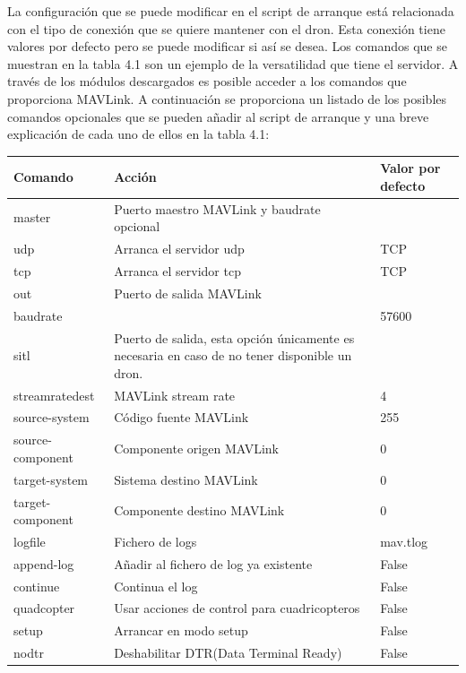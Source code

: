 La configuración que se puede modificar en el script de arranque está relacionada con el tipo de conexión que se quiere mantener con el dron. Esta conexión tiene valores por defecto pero se puede modificar si así se desea. Los comandos que se muestran en la tabla 4.1 son un ejemplo de la versatilidad que tiene el servidor. A través de los módulos descargados es posible acceder a los comandos que proporciona MAVLink. A continuación se proporciona un listado de los posibles comandos opcionales que se pueden añadir al script de arranque y una breve explicación de cada uno de ellos en la tabla 4.1:

\begin{center}
  \label{tab:scriptArranqueComandos}
  \begin{tabular}{ | l | p{7cm} | p{3.5cm} |}
    \hline
    \textbf{Comando} & \textbf{Acción} & \textbf{Valor por defecto} \\ \hline
    master & Puerto maestro MAVLink y baudrate opcional &  \\ \hline
    udp & Arranca el servidor udp & TCP \\ \hline
    tcp & Arranca el servidor tcp & TCP \\ \hline
    out & Puerto de salida MAVLink & \\ \hline
    baudrate & & 57600  \\ \hline
    sitl& Puerto de salida, esta opción únicamente es necesaria en caso de no tener disponible un dron.& \\ \hline
    streamratedest &  MAVLink stream rate & 4 \\ \hline
    source-system & Código fuente MAVLink & 255 \\ \hline
    source-component & Componente origen MAVLink & 0 \\ \hline
    target-system & Sistema destino MAVLink & 0  \\ \hline
    target-component & Componente destino MAVLink & 0 \\ \hline
    logfile & Fichero de logs & mav.tlog \\ \hline
    append-log & Añadir al fichero de log ya existente & False  \\ \hline
    continue & Continua el log& False \\ \hline
    quadcopter& Usar acciones de control para cuadricopteros&  False\\ \hline
    setup& Arrancar en modo setup & False \\ \hline
    nodtr& Deshabilitar DTR(Data Terminal Ready) & False \\ \hline

\end{tabular}
\end{center}
